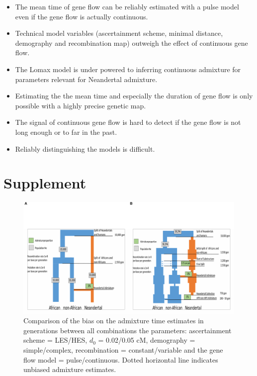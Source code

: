 \documentclass[]{article}
\begin{document}
\begin{itemize}
    \item The mean time of gene flow can be reliably estimated with a pulse model even if the gene flow is actually continuous.
  \item Technical model variables (ascertainment scheme, minimal distance, demography and recombination map) outweigh the effect of continuous gene flow.
  \item The Lomax model is under powered to inferring continuous admixture for parameters relevant for Neandertal admixture.
  \item Estimating the the mean time and especially the duration of gene flow is only possible with a highly precise genetic map.
  \item The signal of continuous gene flow is hard to detect if the gene flow is not long enough or to far in the past.
  \item Reliably distinguishing the models is difficult.
\end{itemize}

\hypertarget{refs}{}




\pagebreak
\setcounter{figure}{0} \renewcommand{\figurename}{Fig. S}
\renewcommand{\tablename}{Tab. S}

\section{Supplement}\label{supplement}

\begin{figure}
\centering
\includegraphics{Admixture_Time_Inference_Paper_Draft_files/figure-latex/figS1-1.pdf}
\caption{\label{fig:figS1}Comparison of the bias on the admixture time
estimates in generations between all combinations the parameters:
ascertainment scheme = LES/HES, \(d_{0}\) = 0.02/0.05 cM, demography =
simple/complex, recombination = constant/variable and the gene flow
model = pulse/continuous. Dotted horizontal line indicates unbiased
admixture estimates.}
\end{figure}
\end{document}
